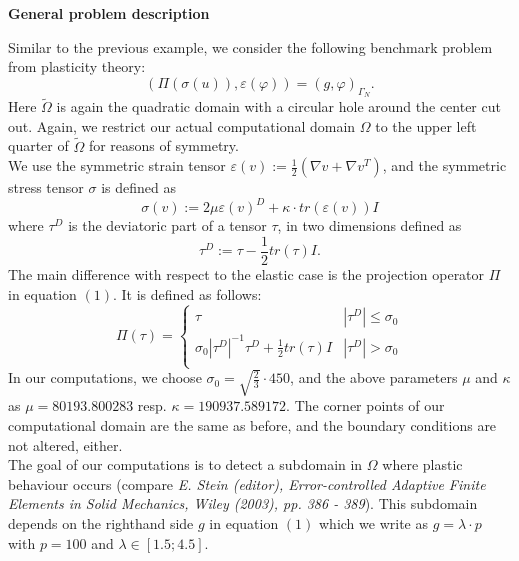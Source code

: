 \textbf{General problem description}

\vspace{0.2cm}

Similar to the previous example, we consider the following benchmark problem from plasticity theory:
\begin{equation}
   (\Pi(\sigma(u)),\varepsilon(\varphi)) = (g,\varphi)_{\Gamma_N}.
\end{equation}
Here $\tilde{\Omega}$ is again the quadratic domain with a circular hole around the center cut out. Again, we restrict our actual computational domain $\Omega$ to the upper left quarter of $\tilde{\Omega}$ for reasons of symmetry.\\
We use the symmetric strain tensor $\varepsilon(v) := \frac{1}{2}(\nabla v + \nabla v^T)$, and the symmetric stress tensor $\sigma$ is defined as
\begin{equation*}
   \sigma(v) := 2\mu \varepsilon(v)^D + \kappa \cdot tr (\varepsilon(v)) I
\end{equation*}
where $\tau^D$ is the deviatoric part of a tensor $\tau$, in two dimensions defined as
\begin{equation*}
   \tau^D := \tau - \frac{1}{2} tr(\tau) I.
\end{equation*}
The main difference with respect to the elastic case is the projection operator $\Pi$ in equation $(1)$. It is defined as follows:
\begin{equation*}
\Pi(\tau) = \left\{
            \begin{array}{lr}
            \tau & |\tau^D| \leq \sigma_0\\
            \sigma_0 |\tau^D|^{-1} \tau^D + \frac{1}{2} tr(\tau) I & |\tau^D| > \sigma_0\\ 
            \end{array}
            \right. 
\end{equation*}
In our computations, we choose $\sigma_0 = \sqrt{\frac{2}{3}}\cdot 450$, and the above parameters $\mu$ and $\kappa$ as $\mu = 80193.800283$ resp. $\kappa = 190937.589172$. The corner points of our computational domain are the same as before, and the boundary conditions are not altered, either.\\
The goal of our computations is to detect a subdomain in $\Omega$ where plastic behaviour occurs (compare \textit{E. Stein (editor), Error-controlled Adaptive Finite Elements in Solid Mechanics, Wiley (2003), pp. 386 - 389}). This subdomain depends on the righthand side $g$ in equation $(1)$ which we write as $g = \lambda \cdot p$ with $p = 100$ and $\lambda \in [1.5;4.5]$.\\


